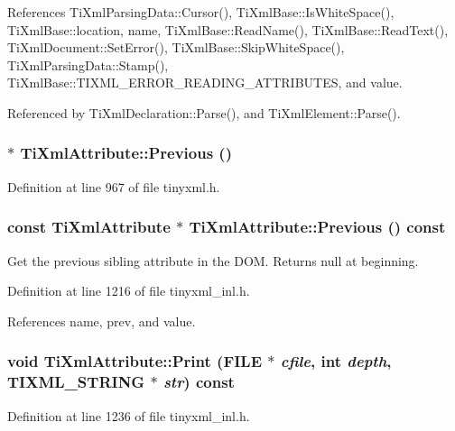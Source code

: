 References TiXmlParsingData::Cursor(), TiXmlBase::IsWhiteSpace(), TiXmlBase::location, name, TiXmlBase::ReadName(), TiXmlBase::ReadText(), TiXmlDocument::SetError(), TiXmlBase::SkipWhiteSpace(), TiXmlParsingData::Stamp(), TiXmlBase::TIXML\_\-ERROR\_\-READING\_\-ATTRIBUTES, and value.

Referenced by TiXmlDeclaration::Parse(), and TiXmlElement::Parse().\hypertarget{class_ti_xml_attribute_ae4dabc932cba945ed1e92fec5f121193}{
\subsubsection[{Previous}]{$\ast$ TiXmlAttribute::Previous ()}}
\label{class_ti_xml_attribute_ae4dabc932cba945ed1e92fec5f121193}


Definition at line 967 of file tinyxml.h.\hypertarget{class_ti_xml_attribute_a54a5f8730c7b02b9a41b74e12e27fe86}{
\subsubsection[{Previous}]{\setlength{\rightskip}{0pt plus 5cm}const {\bf TiXmlAttribute} $\ast$ TiXmlAttribute::Previous () const}}
\label{class_ti_xml_attribute_a54a5f8730c7b02b9a41b74e12e27fe86}


Get the previous sibling attribute in the DOM. Returns null at beginning. 

Definition at line 1216 of file tinyxml\_\-inl.h.

References name, prev, and value.\hypertarget{class_ti_xml_attribute_a19e6b6862a80b188571c47947e88d030}{
\subsubsection[{Print}]{\setlength{\rightskip}{0pt plus 5cm}void TiXmlAttribute::Print (FILE $\ast$ {\em cfile}, \/  int {\em depth}, \/  TIXML\_\-STRING $\ast$ {\em str}) const}}
\label{class_ti_xml_attribute_a19e6b6862a80b188571c47947e88d030}


Definition at line 1236 of file tinyxml\_\-inl.h.


